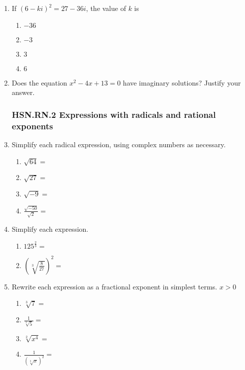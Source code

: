 \documentclass[12pt, twoside]{article}
\begin{document}
\begin{enumerate}[itemsep=0.5cm]
\item If \((6 - ki)^2 = 27 - 36i\), the value of \(k\) is
\begin{enumerate}
    \item \(-36\)
    \item \(-3\)
    \item \(3\)
    \item \(6\)
\end{enumerate} \vspace{2cm}

\item Does the equation $x^2 - 4x + 13 = 0$ have imaginary solutions? Justify your answer.

\newpage
\subsubsection*{HSN.RN.2 Expressions with radicals and rational exponents}
\item Simplify each radical expression, using complex numbers as necessary.
    \begin{multicols}{2}
    \begin{enumerate}[itemsep=0.5cm]
        \item $\sqrt{64}=$
        \item $\sqrt{27}=$
        \item $\sqrt{-9}=$
        \item $\displaystyle \frac{\sqrt{-50}}{\sqrt{2}}=$
    \end{enumerate}
    \end{multicols} \vspace{1cm}
    
\item Simplify each expression.
    \begin{multicols}{2}
    \begin{enumerate}[itemsep=0.5cm]
        \item $\displaystyle 125^{\frac{2}{3}} =$
        \item $\left( \sqrt[3]{\frac{8}{27}} \right)^{2} =$
    \end{enumerate}
    \end{multicols} \vspace{2cm}

    
\item Rewrite each expression as a fractional exponent in simplest terms. $x>0$
    \begin{multicols}{2}
      \begin{enumerate}[itemsep=1cm]
          \item $\sqrt[3]{7} =$
          \item $\displaystyle \frac{1}{\sqrt[3]{5}}=$
          \item $\sqrt[2]{x^4} =$
          \item $\displaystyle \frac{1}{(\sqrt[3]{x})^2}=$
      \end{enumerate}
      \end{multicols} \vspace{1cm}
  

\end{enumerate}
\end{document}
